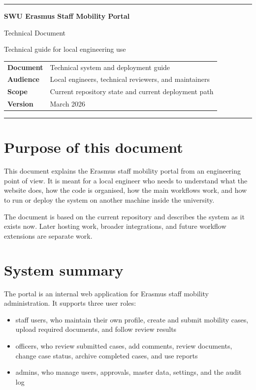 \documentclass[11pt,a4paper]{article}
\newcommand{\doctitle}[1]{{\Huge\bfseries\color{swudark} #1\par}}
\newcommand{\docsubtitle}[1]{{\Large\color{swured} #1\par}}
\begin{document}
\hypersetup{pageanchor=false}
\thispagestyle{empty}
\vspace*{1.5cm}
{\color{swured}\rule{\textwidth}{1.4pt}}
\vspace{1.1cm}
\doctitle{SWU Erasmus Staff Mobility Portal}
\vspace{0.2cm}
\docsubtitle{Technical Document}
\vspace{0.45cm}
{\large Technical guide for local engineering use\par}
\vspace{1.6cm}

\begin{tabular}{@{}p{3.2cm}p{9.3cm}@{}}
\textbf{Document} & Technical system and deployment guide \\
\textbf{Audience} & Local engineers, technical reviewers, and maintainers \\
\textbf{Scope} & Current repository state and current deployment path \\
\textbf{Version} & March 2026 \\
\end{tabular}

\vfill
{\color{swured}\rule{\textwidth}{1.4pt}}
\newpage
{}
\hypersetup{pageanchor=true}
\tableofcontents
\newpage

\section{Purpose of this document}
This document explains the Erasmus staff mobility portal from an engineering point of view. It is meant for a local engineer who needs to understand what the website does, how the code is organised, how the main workflows work, and how to run or deploy the system on another machine inside the university.

The document is based on the current repository and describes the system as it exists now. Later hosting work, broader integrations, and future workflow extensions are separate work.

\section{System summary}
The portal is an internal web application for Erasmus staff mobility administration. It supports three user roles:

\begin{itemize}
  \item staff users, who maintain their own profile, create and submit mobility cases, upload required documents, and follow review results
  \item officers, who review submitted cases, add comments, review documents, change case status, archive completed cases, and use reports
  \item admins, who manage users, approvals, master data, settings, and the audit log
\end{itemize}
\end{document}
